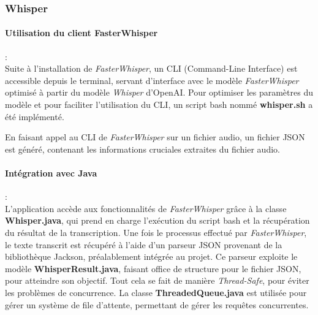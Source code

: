 \subsubsection{Whisper}
\label{sec:whisperImpl}

\paragraph*{Utilisation du client FasterWhisper} : \\
Suite à l'installation de \textit{FasterWhisper}, un CLI (Command-Line Interface) est accessible depuis le terminal, servant d'interface avec le modèle
\textit{FasterWhisper} optimisé à partir du modèle \textit{Whisper} d'OpenAI.
Pour optimiser les paramètres du modèle et pour faciliter l’utilisation du CLI,
un script bash nommé \textbf{whisper.sh} a été implémenté.

En faisant appel au CLI de \textit{FasterWhisper} sur un fichier audio, un fichier JSON est généré, contenant les
informations cruciales extraites du fichier audio.

\paragraph*{Intégration avec Java}: \\
L'application accède aux fonctionnalités de \textit{FasterWhisper} grâce à la
classe \textbf{Whisper.java}, qui prend en charge l'exécution du script bash et
la récupération du résultat de la transcription. Une fois le processus effectué
par \textit{FasterWhisper}, le texte transcrit est récupéré à l'aide d'un
parseur JSON provenant de la bibliothèque Jackson, préalablement intégrée au
projet. Ce parseur exploite le modèle \textbf{WhisperResult.java}, faisant
office de structure pour le fichier JSON, pour atteindre son objectif. Tout
cela se fait de manière \textit{Thread-Safe}, pour éviter les problèmes de
concurrence. La classe \textbf{ThreadedQueue.java} est utilisée pour gérer un
système de file d'attente, permettant de gérer les requêtes concurrentes.